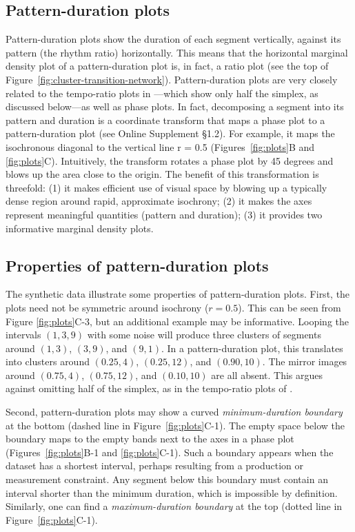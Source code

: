 \documentclass{tMAM2e}%
\theoremstyle{plain}
\theoremstyle{definition}
\theoremstyle{remark}
\newcommand{\suppl}[1]{Online Supplement §#1}
\begin{document}
\subsection{Pattern-duration plots}
Pattern-duration plots show the duration of each segment vertically, against its pattern (the rhythm ratio) horizontally. 
This means that the horizontal marginal density plot of a pattern-duration plot is, in fact, a ratio plot (see the top of Figure~\ref{fig:cluster-transition-network}).
Pattern-duration plots are very closely related to the tempo-ratio plots in \citet{Roeske2020CurrBiol}—which show only half the simplex, as discussed below—as well as phase plots. 
In fact, decomposing a segment into its pattern and duration is a coordinate transform that maps a phase plot to a pattern-duration plot (see \suppl{1.2}).
For example, it maps the isochronous diagonal to the vertical line r = 0.5 (Figures~\ref{fig:plots}B and \ref{fig:plots}C). 
Intuitively, the transform rotates a phase plot by 45 degrees and blows up the area close to the origin. 
The benefit of this transformation is threefold: (1) it makes efficient use of visual space by blowing up a typically dense region around rapid, approximate isochrony; (2) it makes the axes represent meaningful quantities (pattern and duration); (3) it provides two informative marginal density plots. 

\subsection{Properties of pattern-duration plots}
The synthetic data illustrate some properties of pattern-duration plots. 
First, the plots need not be symmetric around isochrony ($r = 0.5$). 
This can be seen from Figure \ref{fig:plots}C-3, but an additional example may be informative. 
Looping the intervals $(1, 3, 9)$ with some noise will produce three clusters of segments around $(1, 3)$, $(3, 9)$, and $(9, 1)$. 
In a pattern-duration plot, this translates into clusters around $(0.25, 4)$, $(0.25, 12)$, and $(0.90, 10)$. 
The mirror images around $(0.75, 4)$, $(0.75, 12)$, and $(0.10, 10)$ are all absent. 
This argues against omitting half of the simplex, as in the tempo-ratio plots of \citet{Roeske2020CurrBiol}.

Second, pattern-duration plots may show a curved \emph{minimum-duration boundary} at the bottom (dashed line in Figure~\ref{fig:plots}C-1). 
The empty space below the boundary maps to the empty bands next to the axes in a phase plot (Figures~\ref{fig:plots}B-1 and \ref{fig:plots}C-1). 
Such a boundary appears when the dataset has a shortest interval, perhaps resulting from a production or measurement constraint. 
Any segment below this boundary must contain an interval shorter than the minimum duration, which is impossible by definition. 
Similarly, one can find a \emph{maximum-duration boundary} at the top (dotted line in Figure~\ref{fig:plots}C-1).
\end{document}
